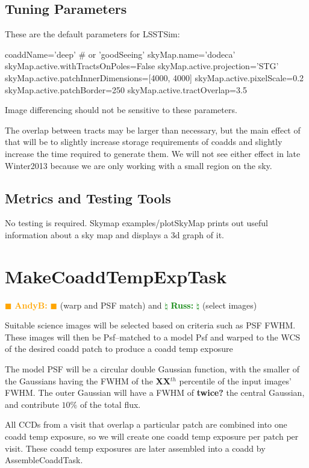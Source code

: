 \documentclass[12pt]{article}
\newcommand{\becker} { \textcolor{orange} {
\ensuremath{\blacksquare} {\bf AndyB:}  
\ensuremath{\blacksquare} } }
\newcommand{\russ} { \textcolor{green} {
\ensuremath{\natural} {\bf Russ:}  
\ensuremath{\natural} } }
\begin{document}
\subsection{Tuning Parameters}

These are the default parameters for LSSTSim:

\begin{python}
coaddName='deep' # or 'goodSeeing'
skyMap.name='dodeca'
skyMap.active.withTractsOnPoles=False
skyMap.active.projection='STG'
skyMap.active.patchInnerDimensions=[4000, 4000]
skyMap.active.pixelScale=0.2
skyMap.active.patchBorder=250
skyMap.active.tractOverlap=3.5
\end{python}

Image differencing should not be sensitive to these parameters.

The overlap between tracts may be larger than necessary, but the main effect of that
will be to slightly increase storage requirements of coadds and slightly increase
the time required to generate them. We will not see either effect in late Winter2013
because we are only working with a small region on the sky.

\subsection{Metrics and Testing Tools}

No testing is required.  Skymap examples/plotSkyMap prints out useful
information about a sky map and displays a 3d graph of it.


\clearpage 
\section{MakeCoaddTempExpTask} \becker (warp and PSF match) and \russ (select images)

Suitable science images will be selected based on criteria such as PSF FWHM.
These images will then be Psf--matched to a model Psf and warped
to the WCS of the desired coadd patch to produce a coadd temp exposure

The model PSF will be a circular double Gaussian
function, with the smaller of the Gaussians having the FWHM of the
{\bf XX}$^{th}$ percentile of the input images' FWHM.  The outer
Gaussian will have a FWHM of {\bf twice?} the central Gaussian, and
contribute {\bf $10\%$} of the total flux.

All CCDs from a visit that overlap a particular patch are combined into one coadd temp exposure,
so we will create one coadd temp exposure per patch per visit.
These coadd temp exposures are later assembled into a coadd by AssembleCoaddTask.
\end{document}
